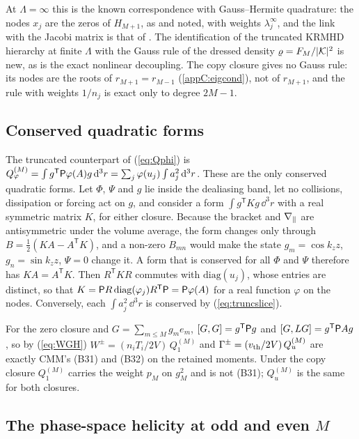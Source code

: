 At $\Lambda=\infty$ this is the known correspondence with Gauss--Hermite quadrature: the nodes $x_j$ are the zeros of $H_{M+1}$, as \citet{ParkerDellar2015} and \citet{Tassi2022} noted, with weights $\lambda^\infty_j$, and the link with the Jacobi matrix is that of \citet{GolubWelsch1969}. The identification of the truncated KRMHD hierarchy at finite $\Lambda$ with the Gauss rule of the dressed density $\varrho=F_M/|\mathcal K|^2$ is new, as is the exact nonlinear decoupling. The copy closure gives no Gauss rule: its nodes are the roots of $r_{M+1}=r_{M-1}$ (\ref{appC:eigcond}), not of $r_{M+1}$, and the rule with weights $1/n_j$ is exact only to degree $2M-1$.

\subsection{Conserved quadratic forms}

The truncated counterpart of (\ref{eq:Qphi}) is $Q^{(M)}_\varphi=\int g^{\mathsf T}\mathsf P\varphi(A)g\,\mathrm{d}^3r=\sum_j\varphi(u_j)\int a_j^2\,\mathrm{d}^3r$. These are the only conserved quadratic forms. Let $\Phi$, $\Psi$ and $g$ lie inside the dealiasing band, let no collisions, dissipation or forcing act on $g$, and consider a form $\int g^{\mathsf T}Kg\,\dd^3r$ with a real symmetric matrix $K$, for either closure. Because the bracket and $\nabla_\parallel$ are antisymmetric under the volume average, the form changes only through $B=\frac12(KA-A^{\mathsf T}K)$, and a non-zero $B_{mn}$ would make the state $g_m=\cos k_zz$, $g_n=\sin k_zz$, $\Psi=0$ change it. A form that is conserved for all $\Phi$ and $\Psi$ therefore has $KA=A^{\mathsf T}K$. Then $R^{\mathsf T}KR$ commutes with $\mathrm{diag}(u_j)$, whose entries are distinct, so that $K=\mathsf P R\,\mathrm{diag}(\varphi_j)R^{\mathsf T}\mathsf P=\mathsf P\varphi(A)$ for a real function $\varphi$ on the nodes. Conversely, each $\int a_j^2\,\dd^3r$ is conserved by (\ref{eq:truncslice}).

For the zero closure and $G=\sum_{m\le M}g_me_m$, $[G,G]=g^{\mathsf T}\mathsf P g$ and $[G,LG]=g^{\mathsf T}\mathsf P Ag$, so by (\ref{eq:WGH}) $W^\pm=(n_iT_i/2V)\,Q^{(M)}_1$ and $\Gamma^\pm=(v_{\mathrm{th}}/2V)\,Q^{(M)}_u$ are exactly CMM's (B31) and (B32) on the retained moments. Under the copy closure $Q^{(M)}_1$ carries the weight $p_M$ on $g_M^2$ and is not (B31); $Q^{(M)}_u$ is the same for both closures.

\subsection{The phase-space helicity at odd and even \texorpdfstring{$M$}{M}}

